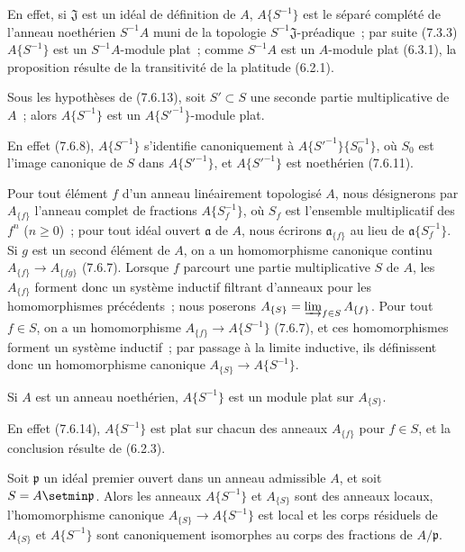En effet, si $\mathfrak J$ est un idéal de définition de $A$,
$A\{S^{-1}\}$ est le séparé complété de l'anneau noethérien $S^{-1}A$ muni
de la topologie $S^{-1}\mathfrak J$-préadique~; par suite (7.3.3)
$A\{S^{-1}\}$ est un $S^{-1}A$-module plat~; comme $S^{-1}A$ est un
$A$-module plat (6.3.1), la proposition résulte de la transitivité de la
platitude (6.2.1).

\begin{corollary}[7.6.14]
\label{0.7.6.14-fr}
Sous les hypothèses de \textup{(7.6.13)}, soit $S'\subset S$ une seconde partie
multiplicative de $A$~; alors $A\{S^{-1}\}$ est un
$A\{{S'}^{-1}\}$-module plat.
\end{corollary}

En effet (7.6.8), $A\{S^{-1}\}$ s'identifie canoniquement à
$A\{{S'}^{-1}\}\{S_0^{-1}\}$, où $S_0$ est l'image canonique de $S$ dans
$A\{{S'}^{-1}\}$, et $A\{{S'}^{-1}\}$ est noethérien (7.6.11).

\begin{env}[7.6.15]
\label{0.7.6.15-fr}
Pour tout élément $f$ d'un anneau linéairement topologisé $A$, nous
désignerons par $A_{\{f\}}$ l'anneau complet de fractions $A\{S_f^{-1}\}$,
où $S_f$ est l'ensemble multiplicatif des $f^n$ ($n\geq 0$)~; pour tout
idéal ouvert $\mathfrak a$ de $A$, nous écrirons $\mathfrak a_{\{f\}}$ au
lieu de $\mathfrak a\{S_f^{-1}\}$. Si $g$ est un second élément de $A$, on a
un homomorphisme canonique continu $A_{\{f\}}\to A_{\{fg\}}$ (7.6.7).
Lorsque $f$ parcourt une partie multiplicative $S$ de $A$, les $A_{\{f\}}$
forment donc un système inductif filtrant d'anneaux pour les homomorphismes
précédents~; nous poserons
$A_{\{S\}}=\varinjlim_{f\in S}A_{\{f\}}$. Pour tout $f\in S$, on a un
homomorphisme $A_{\{f\}}\to A\{S^{-1}\}$ (7.6.7), et
ces homomorphismes forment un système inductif~; par passage à la limite
inductive, ils définissent donc un homomorphisme canonique
$A_{\{S\}}\to A\{S^{-1}\}$.
\end{env}

\begin{proposition}[7.6.16]
\label{0.7.6.16-fr}
Si $A$ est un anneau noethérien, $A\{S^{-1}\}$ est un module plat sur
$A_{\{S\}}$.
\end{proposition}

En effet (7.6.14), $A\{S^{-1}\}$ est plat sur chacun des anneaux
$A_{\{f\}}$ pour $f\in S$, et la conclusion résulte de (6.2.3).

\begin{proposition}[7.6.17]
\label{0.7.6.17-fr}
Soit $\mathfrak p$ un idéal premier ouvert dans un anneau admissible $A$, et
soit $S=A\setmin\mathfrak p$. Alors les anneaux $A\{S^{-1}\}$ et $A_{\{S\}}$ sont
des anneaux locaux, l'homomorphisme canonique
$A_{\{S\}}\to A\{S^{-1}\}$ est local et les corps résiduels de $A_{\{S\}}$
et $A\{S^{-1}\}$ sont canoniquement isomorphes au corps des fractions de
$A/\mathfrak p$.
\end{proposition}

